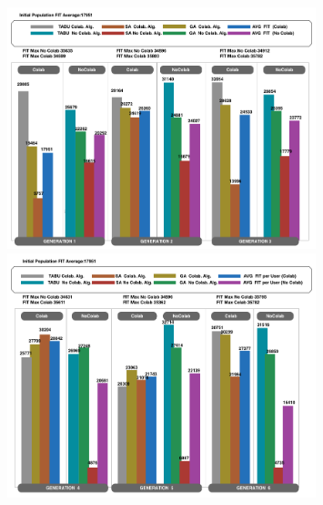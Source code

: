 \begin{figure}[h]
\centering
{}
\includegraphics[width=0.8\textwidth]{./images/GENERATIONS1.png}
\includegraphics[width=0.8\textwidth]{./images/GENERATIONS2.png}
\label{fig:g13moodle}
\end{figure}
